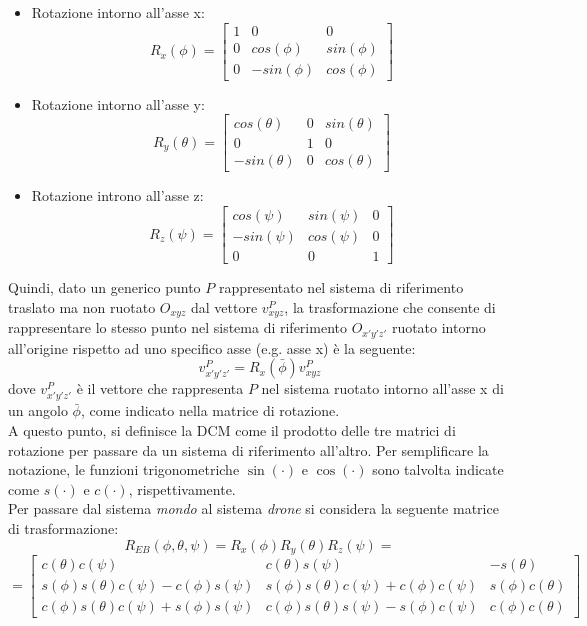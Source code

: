 \begin{itemize}
	\item Rotazione intorno all'asse x:
	\begin{equation}
	R_x(\phi) = 
	\begin{bmatrix}
		1 & 0 & 0\\
		0 & cos(\phi) & sin(\phi)\\
		0 & -sin(\phi) & cos(\phi)
	\end{bmatrix}
	\end{equation}
	\item Rotazione intorno all'asse y:
	\begin{equation}
	R_y(\theta) = 
	\begin{bmatrix}
		cos(\theta) & 0 & sin(\theta)\\
		0 & 1 & 0\\
		-sin(\theta) & 0 & cos(\theta)
	\end{bmatrix}
	\end{equation}
	\item Rotazione introno all'asse z:
	\begin{equation}
	R_z(\psi) = 
	\begin{bmatrix}
		cos(\psi) & sin(\psi) & 0\\
		-sin(\psi) & cos(\psi) & 0\\
		0 & 0 & 1
	\end{bmatrix}
	\end{equation}
\end{itemize}

Quindi, dato un generico punto $P$ rappresentato nel sistema di riferimento traslato ma non ruotato $O_{xyz}$ dal vettore $v^P_{xyz}$, la trasformazione che consente di rappresentare lo stesso punto nel sistema di riferimento $O_{x'y'z'}$ ruotato intorno all'origine rispetto ad uno specifico asse (e.g. asse x) è la seguente:
\[ v^P_{x'y'z'} =  R_x(\bar{\phi})v^P_{xyz}\]
dove $v^P_{x'y'z'}$ è il vettore che rappresenta $P$ nel sistema ruotato intorno all'asse x di un angolo $\bar{\phi}$, come indicato nella matrice di rotazione.\\

A questo punto, si definisce la \ac{DCM} come il prodotto delle tre matrici di rotazione per passare da un sistema di riferimento all'altro. Per semplificare la notazione, le funzioni trigonometriche  $\sin (\cdot)$ e $\cos (\cdot)$ sono talvolta indicate come $s(\cdot)$ e $c(\cdot)$, rispettivamente.\\

Per passare dal sistema \emph{mondo} al sistema \emph{drone} si considera la seguente matrice di trasformazione:
\[
R_{EB}(\phi,\theta,\psi) = 
R_x(\phi)R_y(\theta)R_z(\psi) = 
\]
\begin{equation}
=
\begin{bmatrix}
c(\theta)c(\psi) & c(\theta)s(\psi) & -s(\theta)\\
s(\phi)s(\theta)c(\psi)-c(\phi)s(\psi) & s(\phi)s(\theta)c(\psi)+c(\phi)c(\psi) & s(\phi)c(\theta)\\
c(\phi)s(\theta)c(\psi)+s(\phi)s(\psi) & c(\phi)s(\theta)s(\psi)-s(\phi)c(\psi) & c(\phi)c(\theta)
\end{bmatrix}
\label{dcmEB}
\end{equation}

